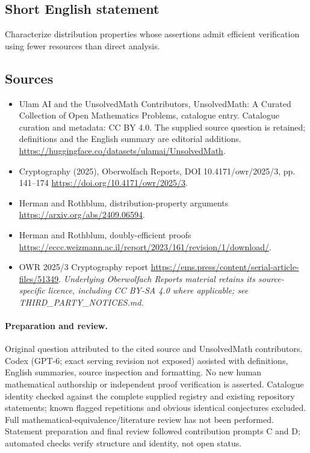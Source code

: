 \documentclass[11pt]{article}
\begin{document}
\subsection{Short English statement}
Characterize distribution properties whose assertions admit efficient verification using fewer resources than direct analysis.
\subsection{Sources}
\begin{itemize}
\item[\hypertarget{source:statement:1}{S1}] Ulam AI and the UnsolvedMath Contributors, UnsolvedMath: A Curated Collection of Open Mathematics Problems, catalogue entry. Catalogue curation and metadata: CC BY 4.0. The supplied source question is retained; definitions and the English summary are editorial additions.
\url{https://huggingface.co/datasets/ulamai/UnsolvedMath}.
\item[\hypertarget{source:statement:2}{S2}] Cryptography (2025), Oberwolfach Reports, DOI 10.4171/owr/2025/3, pp. 141--174
\url{https://doi.org/10.4171/owr/2025/3}.
\item[\hypertarget{source:statement:3}{S3}] Herman and Rothblum, distribution-property arguments
\url{https://arxiv.org/abs/2409.06594}.
\item[\hypertarget{source:statement:4}{S4}] Herman and Rothblum, doubly-efficient proofs
\url{https://eccc.weizmann.ac.il/report/2023/161/revision/1/download/}.
\item[\hypertarget{source:statement:5}{S5}] OWR 2025/3 Cryptography report
\url{https://ems.press/content/serial-article-files/51349}.
\textit{Underlying Oberwolfach Reports material retains its source-specific licence, including CC BY-SA 4.0 where applicable; see THIRD\_PARTY\_NOTICES.md.}
\end{itemize}
\paragraph{Preparation and review.}
Original question attributed to the cited source and UnsolvedMath contributors. Codex (GPT-6; exact serving revision not exposed) assisted with definitions, English summaries, source inspection and formatting. No new human mathematical authorship or independent proof verification is asserted. Catalogue identity checked against the complete supplied registry and existing repository statements; known flagged repetitions and obvious identical conjectures excluded. Full mathematical-equivalence/literature review has not been performed. Statement preparation and final review followed contribution prompts C and D; automated checks verify structure and identity, not open status.
\label{end:statement}
\end{document}
